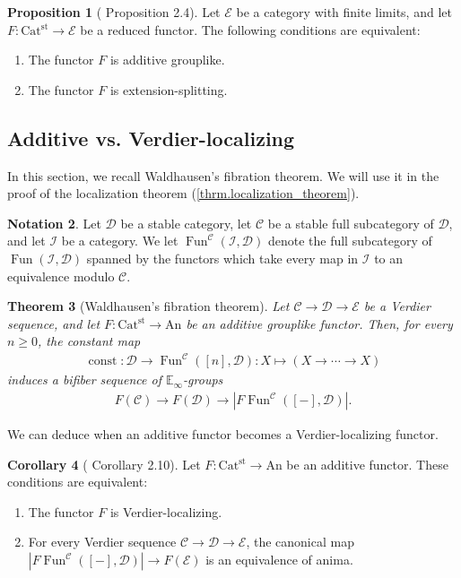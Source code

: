 \documentclass[a4paper,dvipdfmx,11pt,reqno]{amsart}
\DeclareMathOperator{\const}{const}
\DeclareMathOperator{\Fun}{Fun}
\newcommand{\C}{\mathcal{C}}
\newcommand{\D}{\mathcal{D}}
\newcommand{\E}{\mathcal{E}}
\newcommand{\I}{\mathcal{I}}
\newcommand{\An}{\mathrm{An}}
\newcommand{\Catst}{\mathrm{Cat^{st}}}
\newcommand{\Einf}{\mathbb{E}_{\infty}}
\newtheorem{theorem}{Theorem}[section]
\theoremstyle{definition}
\newtheorem{corollary}[theorem]{Corollary}
\newtheorem{notation}[theorem]{Notation}
\newtheorem{proposition}[theorem]{Proposition}
\begin{document}
\begin{proposition}[\cite{HLS23} Proposition 2.4] \label{HLS23.prop.2.4}
  Let $\E$ be a category with finite limits, and let $F : \Catst \to \E$ be a reduced functor.
  The following conditions are equivalent:
  \begin{enumerate}
    \item The functor $F$ is additive grouplike.
    \item The functor $F$ is extension-splitting.
  \end{enumerate}
\end{proposition}

\subsection{Additive vs. Verdier-localizing}

In this section, we recall Waldhausen's fibration theorem.
We will use it in the proof of the localization theorem (\cref{thrm.localization_theorem}).

\begin{notation}
  Let $\D$ be a stable category, let $\C$ be a stable full subcategory of $\D$, and let $\I$ be a category.
  We let $\Fun^{\C}(\I,\D)$ denote the full subcategory of $\Fun(\I,\D)$ spanned by the functors which take every map in $\I$ to an equivalence modulo $\C$.
\end{notation}

\begin{theorem}[Waldhausen's fibration theorem] \label{thrm.Waldhausen_fibration_theorem}
  Let $\C \to \D \to \E$ be a Verdier sequence, and let $F : \Catst \to \An$ be an additive grouplike functor.
  Then, for every $n \geq 0$, the constant map 
  \begin{align*}
    \const : \D \to \Fun^{\C}([n],\D) : X \mapsto (X \to \cdots \to X)
  \end{align*}
  induces a bifiber sequence of $\Einf$-groups 
  \begin{align*}
    F(\C) \to F(\D) \to |F\Fun^{\C}([-],\D)|.
  \end{align*}
\end{theorem}

We can deduce when an additive functor becomes a Verdier-localizing functor.

\begin{corollary}[\cite{HLS23} Corollary 2.10] \label{HLS23.cor.2.10}
  Let $F : \Catst \to \An$ be an additive functor.
  These conditions are equivalent:
  \begin{enumerate}
    \item The functor $F$ is Verdier-localizing.
    \item For every Verdier sequence $\C \to \D \to \E$, the canonical map $|F\Fun^{\C}([-],\D)| \to F(\E)$ is an equivalence of anima.
  \end{enumerate}
\end{corollary}
\end{document}
